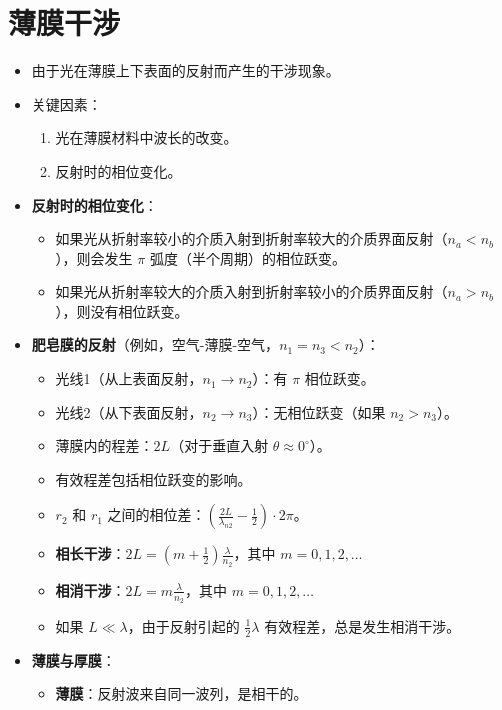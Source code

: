 \documentclass[UTF8]{ctexart}
\begin{document}
\section{薄膜干涉}
\begin{itemize}
    \item 由于光在薄膜上下表面的反射而产生的干涉现象。
    \item 关键因素：
        \begin{enumerate}
            \item 光在薄膜材料中波长的改变。
            \item 反射时的相位变化。
        \end{enumerate}
    \item \textbf{反射时的相位变化}：
        \begin{itemize}
            \item 如果光从折射率较小的介质入射到折射率较大的介质界面反射（$n_a < n_b$），则会发生 $\pi$ 弧度（半个周期）的相位跃变。
            \item 如果光从折射率较大的介质入射到折射率较小的介质界面反射（$n_a > n_b$），则没有相位跃变。
        \end{itemize}
    \item \textbf{肥皂膜的反射}（例如，空气-薄膜-空气，$n_1=n_3 < n_2$）：
        \begin{itemize}
            \item 光线1（从上表面反射，$n_1 \to n_2$）：有 $\pi$ 相位跃变。
            \item 光线2（从下表面反射，$n_2 \to n_3$）：无相位跃变（如果 $n_2 > n_3$）。
            \item 薄膜内的程差：$2L$（对于垂直入射 $\theta \approx 0^\circ$）。
            \item 有效程差包括相位跃变的影响。
            \item $r_2$ 和 $r_1$ 之间的相位差：$(\frac{2L}{\lambda_{n2}} - \frac{1}{2}) \cdot 2\pi$。
            \item \textbf{相长干涉}：$2L = (m + \frac{1}{2})\frac{\lambda}{n_2}$，其中 $m=0, 1, 2, \dots$
            \item \textbf{相消干涉}：$2L = m\frac{\lambda}{n_2}$，其中 $m=0, 1, 2, \dots$
            \item 如果 $L \ll \lambda$，由于反射引起的 $\frac{1}{2}\lambda$ 有效程差，总是发生相消干涉。
        \end{itemize}
    \item \textbf{薄膜与厚膜}：
        \begin{itemize}
            \item \textbf{薄膜}：反射波来自同一波列，是相干的。

\end{itemize}
\end{itemize}
\end{document}
